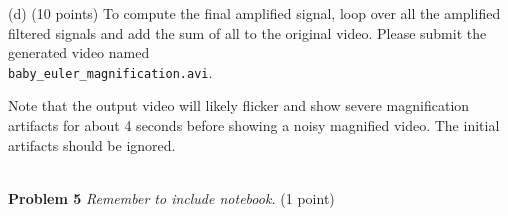 \documentclass[11pt]{article}
\newcommand{\hwproblem}[2] {\noindent \\ {\bf #1} {\it #2}}
\begin{document}
(d) (10 points) To compute the final amplified signal, loop over all the amplified filtered signals and add the sum of all to the original video. Please submit the generated video named \\
\texttt{baby\_euler\_magnification.avi}.  

Note that the output video will likely flicker and show severe magnification artifacts for about 4 seconds before showing a noisy magnified video. The initial artifacts should be ignored.

\hwproblem{Problem 5}{Remember to include notebook.} (1 point)



\end{document}
